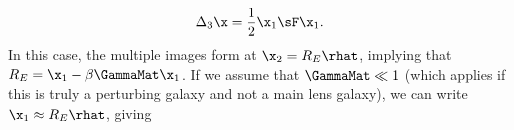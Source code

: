 \begin{equation}
\Delta_3 \x = \frac{1}{2} \x_1 \sF \x_1.
\end{equation}
In this case, the multiple images form at $\x_2 = R_E \rhat$, implying that $R_E = \x_1 - \beta \GammaMat \x_1$. If we assume that $\GammaMat \ll 1$ (which applies if this is truly a perturbing galaxy and not a main lens galaxy), we can write $\x_1 \approx R_E \rhat$, giving
  
  